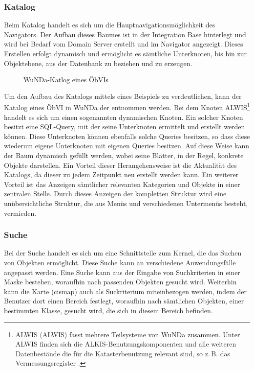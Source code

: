 \subsubsection{Katalog} \label{subsubsec:katalog}
Beim Katalog handelt es sich um die Hauptnavigationsmöglichkeit des Navigators.
Der Aufbau dieses Baumes ist in der Integration Base hinterlegt und wird bei Bedarf vom Domain Server erstellt und im Navigator angezeigt.
Dieses Erstellen erfolgt dynamisch und ermöglicht es sämtliche Unterknoten, bis hin zur Objektebene, aus der Datenbank zu beziehen und zu erzeugen.

\begin{figure}[htb]
	\centering
	\caption{WuNDa-Katlog eines ÖbVIs}
	\label{fig:katlog-oebvi}
\end{figure}

Um den Aufbau des Katalogs mittels eines Beispiels zu verdeutlichen, kann der Katalog eines \ac{ÖbVI} in \ac{WuNDa} der  entnommen werden.
Bei dem Knoten \acs{ALWIS}\footnote{\acs{ALWIS} (\acl{ALWIS}) fasst mehrere Teilsysteme von \ac{WuNDa} zusammen. Unter \acs{ALWIS} finden sich die ALKIS-Benutzungskomponenten und alle weiteren Datenbestände die für die Katasterbenutzung relevant sind, so z.\,B. das Vermessungsregister \autocite[vgl.][]{wupp-wunda-oebvi}.} handelt es sich um einen sogenannten dynamischen Knoten.
Ein solcher Knoten besitzt eine SQL-Query, mit der seine Unterknoten ermittelt und erstellt werden können.
Diese Unterknoten können ebenfalls solche Queries besitzen, so dass diese wiederum eigene Unterknoten mit eigenen Queries besitzen.
Auf diese Weise kann der Baum dynamisch gefüllt werden, wobei seine Blätter, in der Regel, konkrete Objekte darstellen.
Ein Vorteil dieser Herangehensweise ist die Aktualität des Katalogs, da dieser zu jedem Zeitpunkt neu erstellt werden kann.
Ein weiterer Vorteil ist das Anzeigen sämtlicher relevanten Kategorien und Objekte in einer zentralen Stelle.
Durch dieses Anzeigen der kompletten Struktur wird eine unübersichtliche Struktur, die aus Menüs und verschiedenen Untermenüs besteht, vermieden.

\subsubsection{Suche}
Bei der Suche handelt es sich um eine Schnittstelle zum Kernel, die das Suchen von Objekten ermöglicht.
Diese Suche kann an verschiedene Anwendungsfälle angepasst werden.
Eine Suche kann aus der Eingabe von Suchkriterien in einer Maske bestehen, woraufhin nach passenden Objekten gesucht wird.
Weiterhin kann die Karte (cismap) auch als Suckriterium miteinbezogen werden, indem der Benutzer dort einen Bereich festlegt, woraufhin nach sämtlichen Objekten, einer bestimmten Klasse, gesucht wird, die sich in diesem Bereich befinden.

